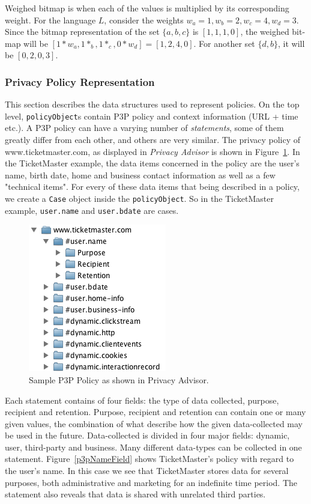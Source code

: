 Weighed bitmap is when each of the values is multiplied by its corresponding weight. For the language $L$, consider the weights $w_a=1, w_b=2, w_c=4, w_d=3$. Since the bitmap representation of the set $\{a,b,c\}$ is $[1, 1, 1, 0]$, the weighed bit-map will be $[1*w_a, 1*_b, 1*_c, 0*w_d]=[1, 2, 4, 0]$. For another set $\{d,b\}$, it will be $[0, 2, 0, 3]$.

\subsubsection{Privacy Policy Representation}

This section describes the data structures used to represent policies. On the top level, \texttt{policyObject}s contain P3P policy and context information (URL + time etc.). A P3P policy can have a varying number of \emph{statements}, some of them greatly differ from each other, and others are very similar. The privacy policy of www.ticketmaster.com, as displayed in \emph{Privacy Advisor} is shown in Figure~\ref{p3pPol}. In the TicketMaster example, the data items concerned in the policy are the user's name, birth date, home and business contact information as well as a few "technical items". For every of these data items that being described in a policy, we create a \texttt{Case} object inside the \texttt{policyObject}. So in the TicketMaster example, \texttt{user.name} and \texttt{user.bdate} are cases.

\begin{figure}[htbp]
\begin{center}
\includegraphics{Implementation/p3p_pol}
\caption{Sample P3P Policy as shown in Privacy Advisor.}
\label{p3pPol}
\end{center}
\end{figure}

Each statement contains of four fields: the type of data collected, purpose, recipient and retention. Purpose, recipient and retention can contain one or many given values, the combination of what describe how the given data-collected may be used in the future. Data-collected is divided in four major fields: dynamic, user, third-party and business. Many different data-types can be collected in one statement. Figure~\ref{p3pNameField} shows TicketMaster's policy with regard to the user's name. In this case we see that TicketMaster stores data for several purposes, both administrative and marketing for an indefinite time period. The statement also reveals that data is shared with unrelated third parties.


